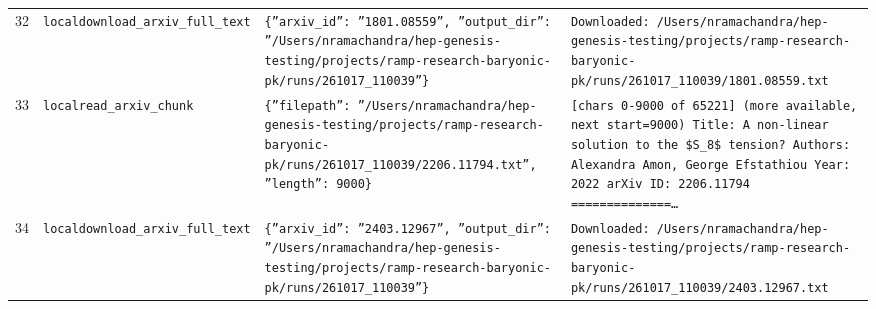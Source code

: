 \documentclass[11pt,a4paper]{article}
\begin{document}
\begin{longtable}{@{}p{}p{}p{}p{}@{}}
32 & \texttt{local}\newline\texttt{download\_\allowbreak{}arxiv\_\allowbreak{}full\_\allowbreak{}text} & \texttt{\{''arxiv\_\allowbreak{}id'':\allowbreak{} ''1801.08559'',\allowbreak{} ''output\_\allowbreak{}dir'':\allowbreak{} ''/\allowbreak{}Users/\allowbreak{}nramachandra/\allowbreak{}hep-genesis-testing/\allowbreak{}projects/\allowbreak{}ramp-research-baryonic-pk/\allowbreak{}runs/\allowbreak{}261017\_\allowbreak{}110039''\}\allowbreak{}} & \texttt{Downloaded:\allowbreak{} /\allowbreak{}Users/\allowbreak{}nramachandra/\allowbreak{}hep-genesis-testing/\allowbreak{}projects/\allowbreak{}ramp-research-baryonic-pk/\allowbreak{}runs/\allowbreak{}261017\_\allowbreak{}110039/\allowbreak{}1801.08559.txt} \\
33 & \texttt{local}\newline\texttt{read\_\allowbreak{}arxiv\_\allowbreak{}chunk} & \texttt{\{''filepath'':\allowbreak{} ''/\allowbreak{}Users/\allowbreak{}nramachandra/\allowbreak{}hep-genesis-testing/\allowbreak{}projects/\allowbreak{}ramp-research-baryonic-pk/\allowbreak{}runs/\allowbreak{}261017\_\allowbreak{}110039/\allowbreak{}2206.11794.txt'',\allowbreak{} ''length'':\allowbreak{} 9000\}\allowbreak{}} & \texttt{[chars 0-9000 of 65221]\allowbreak{} (more available,\allowbreak{} next start=\allowbreak{}9000)\allowbreak{}  Title:\allowbreak{} A non-linear solution to the \$S\_\allowbreak{}8\$ tension? Authors:\allowbreak{} Alexandra Amon,\allowbreak{} George Efstathiou Year:\allowbreak{} 2022 arXiv ID:\allowbreak{} 2206.11794  =\allowbreak{}=\allowbreak{}=\allowbreak{}=\allowbreak{}=\allowbreak{}=\allowbreak{}=\allowbreak{}=\allowbreak{}=\allowbreak{}=\allowbreak{}=\allowbreak{}=\allowbreak{}=\allowbreak{}=\allowbreak{}\ldots{}\allowbreak{}} \\
34 & \texttt{local}\newline\texttt{download\_\allowbreak{}arxiv\_\allowbreak{}full\_\allowbreak{}text} & \texttt{\{''arxiv\_\allowbreak{}id'':\allowbreak{} ''2403.12967'',\allowbreak{} ''output\_\allowbreak{}dir'':\allowbreak{} ''/\allowbreak{}Users/\allowbreak{}nramachandra/\allowbreak{}hep-genesis-testing/\allowbreak{}projects/\allowbreak{}ramp-research-baryonic-pk/\allowbreak{}runs/\allowbreak{}261017\_\allowbreak{}110039''\}\allowbreak{}} & \texttt{Downloaded:\allowbreak{} /\allowbreak{}Users/\allowbreak{}nramachandra/\allowbreak{}hep-genesis-testing/\allowbreak{}projects/\allowbreak{}ramp-research-baryonic-pk/\allowbreak{}runs/\allowbreak{}261017\_\allowbreak{}110039/\allowbreak{}2403.12967.txt} \\

\end{longtable}
\end{document}
